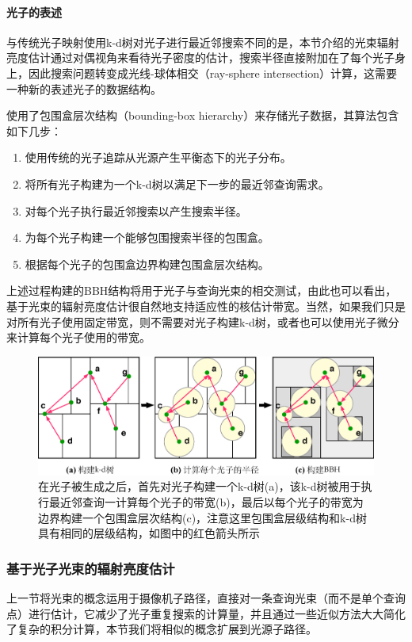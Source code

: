\paragraph{光子的表述}
与传统光子映射使用k-d树对光子进行最近邻搜索不同的是，本节介绍的光束辐射亮度估计通过对偶视角来看待光子密度的估计，搜索半径直接附加在了每个光子身上，因此搜索问题转变成光线-球体相交（ray-sphere intersection）计算，这需要一种新的表述光子的数据结构。

\cite{a:TheBeamRadianceEstimateforVolumetricPhotonMapping}使用了包围盒层次结构（bounding-box hierarchy）来存储光子数据，其算法包含如下几步：

\begin{enumerate}
	\item 使用传统的光子追踪从光源产生平衡态下的光子分布。
	\item 将所有光子构建为一个k-d树以满足下一步的最近邻查询需求。
	\item 对每个光子执行最近邻搜索以产生搜索半径。
	\item 为每个光子构建一个能够包围搜索半径的包围盒。
	\item 根据每个光子的包围盒边界构建包围盒层次结构。
\end{enumerate}

上述过程构建的BBH结构将用于光子与查询光束的相交测试，由此也可以看出，基于光束的辐射亮度估计很自然地支持适应性的核估计带宽。当然，如果我们只是对所有光子使用固定带宽，则不需要对光子构建k-d树，或者也可以使用光子微分来计算每个光子使用的带宽。

\begin{figure}
	\includegraphics[width=1.0\textwidth]{figures/pm/bbh}
	\caption{在光子被生成之后，首先对光子构建一个k-d树(a)，该k-d树被用于执行最近邻查询一计算每个光子的带宽(b)，最后以每个光子的带宽为边界构建一个包围盒层次结构(c)，注意这里包围盒层级结构和k-d树具有相同的层级结构，如图中的红色箭头所示}
	\label{f:pm-bbh}
\end{figure}



\subsubsection{基于光子光束的辐射亮度估计}
上一节将光束的概念运用于摄像机子路径，直接对一条查询光束（而不是单个查询点）进行估计，它减少了光子重复搜索的计算量，并且通过一些近似方法大大简化了复杂的积分计算，本节我们将相似的概念扩展到光源子路径。

